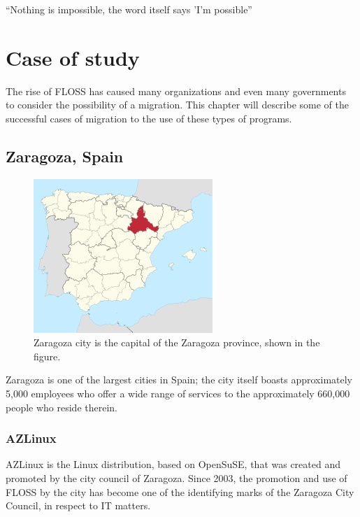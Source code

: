 \newpage
\begin{savequote}[108mm]
``Nothing is impossible, the word itself says 'I'm possible''
\end{savequote}
\chapter{Case of study}
\label{chap:Caseofstudy}
\vspace{-2cm}
The rise of FLOSS has caused many organizations and even many governments to consider the possibility of a migration. This chapter will describe some of the successful cases of migration to the use of these types of programs. 

\section {Zaragoza, Spain}
\label{Zaragoza}

\begin{figure}[H]
\centering
    \includegraphics[scale=0.8]{img/Zaragoza.png} 
  \caption{Zaragoza city is the capital of the Zaragoza province, shown in the figure.}
    \end{figure}

Zaragoza is one of the largest cities in Spain; the city itself boasts approximately 5,000 employees who offer a wide range of services to the approximately 660,000 people who reside therein. 

\subsection{AZLinux}

AZLinux is the Linux distribution, based on OpenSuSE, that was created and promoted by the city council of Zaragoza. Since 2003, the promotion and use of  FLOSS by the city has become one of the identifying marks of the Zaragoza City Council, in respect to IT matters.

